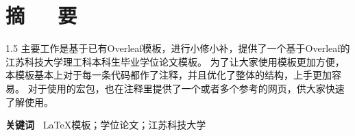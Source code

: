 \chapter{摘\ \ \  要}
\begin{spacing}{1.5}
{\songti{}
主要工作是基于已有Overleaf模板，进行小修小补，提供了一个基于Overleaf的江苏科技大学理工科本科生毕业学位论文模板。
为了让大家使用模板更加方便，本模板基本上对于每一条代码都作了注释，并且优化了整体的结构，上手更加容易。
对于使用的宏包，也在注释里提供了一个或者多个参考的网页，供大家快速了解使用。}
\end{spacing}

\textbf{关键词~} \LaTeX 模板；学位论文；江苏科技大学

\clearpage									%
